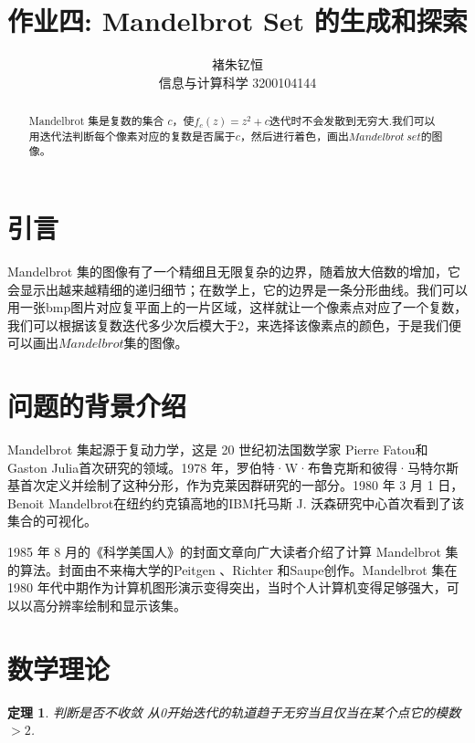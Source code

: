 \documentclass{article}
\title{作业四: Mandelbrot Set 的生成和探索}
\author{褚朱钇恒 \\ 信息与计算科学 3200104144}
\newtheorem{theorem}{定理}
\begin{document}
\maketitle

\begin{abstract}
     Mandelbrot 集是复数的集合 $c$，使$f_{c}(z)=z^{2}+c$迭代时不会发散到无穷大.我们可以用迭代法判断每个像素对应的复数是否属于$c$，然后进行着色，画出$Mandelbrot\ set$的图像。
\end{abstract}
\section{引言}
Mandelbrot 集的图像有了一个精细且无限复杂的边界，随着放大倍数的增加，它会显示出越来越精细的递归细节；在数学上，它的边界是一条分形曲线。我们可以用一张bmp图片对应复平面上的一片区域，这样就让一个像素点对应了一个复数，我们可以根据该复数迭代多少次后模大于2，来选择该像素点的颜色，于是我们便可以画出$Mandelbrot$集的图像。
\section{问题的背景介绍}
Mandelbrot 集起源于复动力学，这是 20 世纪初法国数学家 Pierre Fatou和Gaston Julia首次研究的领域。1978 年，罗伯特·W·布鲁克斯和彼得·马特尔斯基首次定义并绘制了这种分形，作为克莱因群研究的一部分。1980 年 3 月 1 日，Benoit Mandelbrot在纽约约克镇高地的IBM托马斯 J. 沃森研究中心首次看到了该集合的可视化。

1985 年 8 月的《科学美国人》的封面文章向广大读者介绍了计算 Mandelbrot 集的算法。封面由不来梅大学的Peitgen 、Richter 和Saupe创作。Mandelbrot 集在 1980 年代中期作为计算机图形演示变得突出，当时个人计算机变得足够强大，可以以高分辨率绘制和显示该集。\cite{wikipedia_Mandelbrot}

\section{数学理论}
\begin{theorem}{判断是否不收敛}
     从0开始迭代的轨道趋于无穷当且仅当在某个点它的模数$>2$.
\end{theorem}
\end{document}
